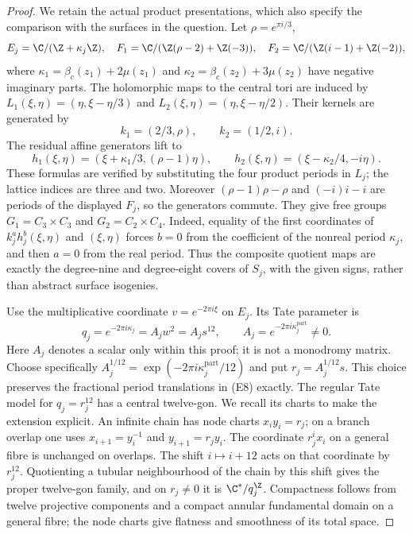 \begin{proof}
We retain the actual product presentations, which also specify the
comparison with the surfaces in the question. Let
$\rho=e^{\pi i/3}$,
\[
 E_j=\C/(\Z+\kappa_j\Z),\quad
 F_1=\C/(\Z(\rho-2)+\Z(-3)),\quad
 F_2=\C/(\Z(i-1)+\Z(-2)),
\]
where $\kappa_1=\beta_c(z_1)+2\mu(z_1)$ and
$\kappa_2=\beta_c(z_2)+3\mu(z_2)$ have negative imaginary parts.
The holomorphic maps to the central tori are induced by
$L_1(\xi,\eta)=(\eta,\xi-\eta/3)$ and
$L_2(\xi,\eta)=(\eta,\xi-\eta/2)$. Their kernels are generated by
\[
 k_1=(2/3,\rho),\qquad k_2=(1/2,i).
\]
The residual affine generators lift to
\[
 h_1(\xi,\eta)=(\xi+\kappa_1/3,(\rho-1)\eta),\qquad
 h_2(\xi,\eta)=(\xi-\kappa_2/4,-i\eta).                     \tag{E8}
\]
These formulas are verified by substituting the four product periods
in $L_j$; the lattice indices are three and two. Moreover
$(\rho-1)\rho-\rho$ and $(-i)i-i$ are periods of the displayed
$F_j$, so the generators commute. They give free groups
$G_1=C_3\times C_3$ and $G_2=C_2\times C_4$. Indeed, equality of
the first coordinates of $k_j^a h_j^b(\xi,\eta)$ and $(\xi,\eta)$
forces $b=0$ from the coefficient of the nonreal period $\kappa_j$,
and then $a=0$ from the real period. Thus the composite quotient
maps are exactly the degree-nine and degree-eight covers of $S_j$,
with the given signs, rather than abstract surface isogenies.

Use the multiplicative coordinate $v=e^{-2\pi i\xi}$ on $E_j$.
Its Tate parameter is
\[
       q_j=e^{-2\pi i\kappa_j}=A_jw^2=A_js^{12},
       \qquad A_j=e^{-2\pi i\kappa_j^{\mathrm{part}}}\ne0.
\]
Here $A_j$ denotes a scalar only within this proof; it is not a
monodromy matrix. Choose specifically
$A_j^{1/12}=\exp(-2\pi i\kappa_j^{\mathrm{part}}/12)$ and put
$r_j=A_j^{1/12}s$. This choice preserves the fractional period
translations in (E8) exactly. The regular Tate model for $q_j=r_j^{12}$
has a central twelve-gon. We recall its charts to make the extension
explicit. An infinite chain has node charts
$x_i y_i=r_j$; on a branch overlap one uses
$x_{i+1}=y_i^{-1}$ and $y_{i+1}=r_jy_i$. The coordinate
$r_j^i x_i$ on a general fibre is unchanged on overlaps.
The shift $i\mapsto i+12$ acts on that coordinate by $r_j^{12}$.
Quotienting a tubular neighbourhood of the chain by this shift gives
the proper twelve-gon family, and on $r_j\ne0$ it is
$\C^*/q_j^\Z$. Compactness follows from twelve projective components
and a compact annular fundamental domain on a general fibre;
the node charts give flatness and smoothness of its total space.


\end{proof}
